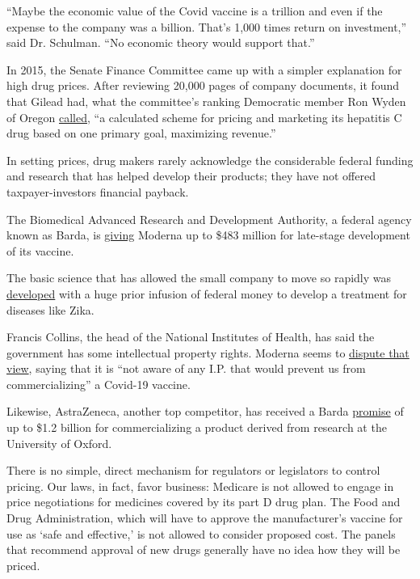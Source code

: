 ``Maybe the economic value of the Covid vaccine is a trillion and even
if the expense to the company was a billion. That's 1,000 times return
on investment,'' said Dr. Schulman. ``No economic theory would support
that.''

In 2015, the Senate Finance Committee came up with a simpler explanation
for high drug prices. After reviewing 20,000 pages of company documents,
it found that Gilead had, what the committee's ranking Democratic member
Ron Wyden of Oregon
\href{https://www.finance.senate.gov/ranking-members-news/wyden-grassley-sovaldi-investigation-finds-revenue-driven-pricing-strategy-behind-84-000-hepatitis-drug}{called},
``a calculated scheme for pricing and marketing its hepatitis C drug
based on one primary goal, maximizing revenue.''

In setting prices, drug makers rarely acknowledge the considerable
federal funding and research that has helped develop their products;
they have not offered taxpayer-investors financial payback.

The Biomedical Advanced Research and Development Authority, a federal
agency known as Barda, is
\href{https://www.europeanpharmaceuticalreview.com/news/117327/barda-to-give-moderna-up-to-483-million-for-covid-19-vaccine-development/}{giving}
Moderna up to \$483 million for late-stage development of its vaccine.

The basic science that has allowed the small company to move so rapidly
was
\href{https://www.patientsforaffordabledrugs.org/2020/05/10/covid-blog-moderna/}{developed}
with a huge prior infusion of federal money to develop a treatment for
diseases like Zika.

Francis Collins, the head of the National Institutes of Health, has said
the government has some intellectual property rights. Moderna seems to
\href{https://www.axios.com/moderna-nih-coronavirus-vaccine-ownership-agreements-22051c42-2dee-4b19-938d-099afd71f6a0.html}{dispute
that view}, saying that it is ``not aware of any I.P. that would prevent
us from commercializing'' a Covid-19 vaccine.

Likewise, AstraZeneca, another top competitor, has received a Barda
\href{https://www.hhs.gov/about/news/2020/05/21/trump-administration-accelerates-astrazeneca-covid-19-vaccine-to-be-available-beginning-in-october.html}{promise}
of up to \$1.2 billion for commercializing a product derived from
research at the University of Oxford.

There is no simple, direct mechanism for regulators or legislators to
control pricing. Our laws, in fact, favor business: Medicare is not
allowed to engage in price negotiations for medicines covered by its
part D drug plan. The Food and Drug Administration, which will have to
approve the manufacturer's vaccine for use as `safe and effective,' is
not allowed to consider proposed cost. The panels that recommend
approval of new drugs generally have no idea how they will be priced.

